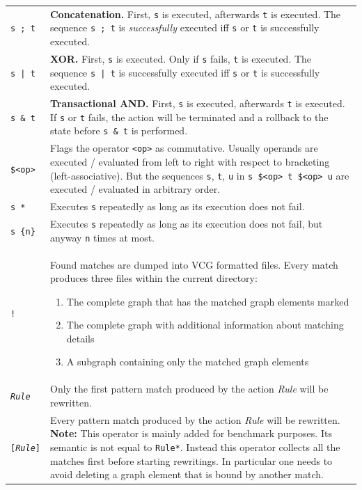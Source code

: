\begin{table}[htbp]
\begin{minipage}{\linewidth} \renewcommand{\footnoterule}{} 
\begin{tabularx}{\linewidth}{|lX|}
\hline
\texttt{s ; t}		& \textbf{Concatenation.} First, \texttt{s} is executed, afterwards \texttt{t} is executed. The sequence \texttt{s ; t} is \emph{successfully} executed iff \texttt{s} or \texttt{t} is successfully executed.\\
\texttt{s | t}		& \textbf{XOR.} First, \texttt{s} is executed. Only if \texttt{s} fails, \texttt{t} is executed. The sequence \texttt{s | t} is successfully executed iff \texttt{s} or \texttt{t} is successfully executed.\\
\texttt{s \& t}	& \textbf{Transactional AND.} First, \texttt{s} is executed, afterwards \texttt{t} is executed. If \texttt{s} or \texttt{t} fails, the action will be terminated and a rollback to the state before \texttt{s \& t} is performed.\\
\texttt{\$<op>}	& Flags the operator \texttt{<op>} as commutative. Usually operands are executed / evaluated from left to right with respect to bracketing (left-associative). But the sequences \texttt{s}, \texttt{t}, \texttt{u} in \texttt{s \$<op> t \$<op> u} are executed / evaluated in arbitrary order. \\
\texttt{s *}		& Executes \texttt{s} repeatedly as long as its execution does not fail.\\
\texttt{s \{n\}}	& Executes \texttt{s} repeatedly as long as its execution does not fail, but anyway \texttt{n} times at most.\\
\texttt{!}		& Found matches are dumped into VCG formatted files. Every match produces three files within the current directory:
\begin{enumerate}
  \item The complete graph that has the matched graph elements marked
  \item The complete graph with additional information about matching details
  \item A subgraph containing only the matched graph elements
\end{enumerate}\\
\texttt{\emph{Rule}} & Only the first pattern match produced by the action \emph{Rule} will be rewritten.\\
\texttt{[\emph{Rule}]} & Every pattern match produced by the action \emph{Rule} will be rewritten. \textbf{Note:} This operator is mainly added for benchmark purposes. Its semantic is not equal to \texttt{Rule*}. Instead this operator collects all the matches first before starting rewritings. In particular one needs to avoid deleting a graph element that is bound by another match. \\

\end{tabularx}
\end{minipage}
\end{table}
